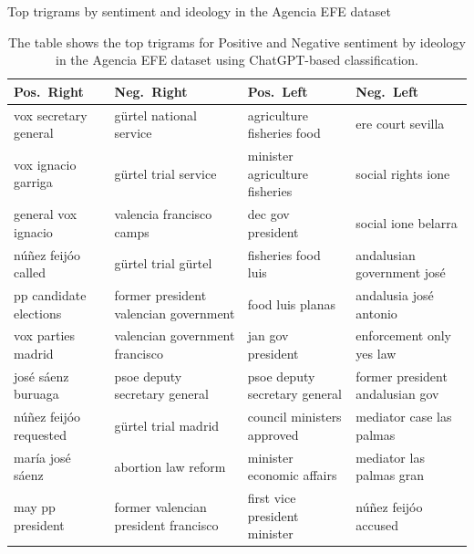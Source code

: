 \documentclass[12pt]{article}
\begin{document}

	
	
	\begin{table}[!htb]
		\centering
		\scriptsize
		\caption{Top trigrams by sentiment and ideology in the Agencia EFE dataset}
		\label{tab:top_trigrams_combined}
		\begin{tabular}{|l|l|l|l|}
			\hline
			\textbf{Pos.\ Right} & \textbf{Neg.\ Right} & \textbf{Pos.\ Left} & \textbf{Neg.\ Left} \\
			\hline
			vox secretary general          & gürtel national service        & agriculture fisheries food   & ere court sevilla                \\
			vox ignacio garriga            & gürtel trial service           & minister agriculture fisheries & social rights ione              \\
			general vox ignacio            & valencia francisco camps       & dec gov president            & social ione belarra             \\
			núñez feijóo called            & gürtel trial gürtel            & fisheries food luis          & andalusian government josé      \\
			pp candidate elections         & former president valencian government & food luis planas         & andalusia josé antonio          \\
			vox parties madrid             & valencian government francisco & jan gov president            & enforcement only yes law        \\
			josé sáenz buruaga             & psoe deputy secretary general  & psoe deputy secretary general & former president andalusian gov \\
			núñez feijóo requested         & gürtel trial madrid            & council ministers approved   & mediator case las palmas        \\
			maría josé sáenz               & abortion law reform            & minister economic affairs    & mediator las palmas gran        \\
			may pp president               & former valencian president francisco & first vice president minister & núñez feijóo accused      \\
			\hline
		\end{tabular}
		\caption*{\scriptsize The table shows the top trigrams for Positive and Negative sentiment by ideology in the Agencia EFE dataset using ChatGPT-based classification.}
				\label{tab:top_trigrams}
	\end{table}
	
\end{document}
